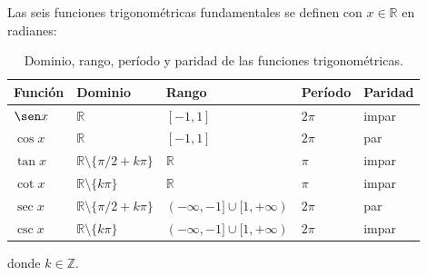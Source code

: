 \begin{definition}
Las seis funciones trigonométricas fundamentales se definen con $x \in \mathbb{R}$ en radianes:

\begin{table}[H]
\centering
\renewcommand{\arraystretch}{1.5}
\begin{tabular}{|l|l|l|l|l|}
\hline
\textbf{Función} & \textbf{Dominio} & \textbf{Rango} & \textbf{Período} & \textbf{Paridad} \\
\hline
$\sen x$ & $\mathbb{R}$ & $[-1,1]$ & $2\pi$ & impar \\
$\cos x$ & $\mathbb{R}$ & $[-1,1]$ & $2\pi$ & par \\
$\tan x$ & $\mathbb{R}\setminus\{\pi/2+k\pi\}$ & $\mathbb{R}$ & $\pi$ & impar \\
$\cot x$ & $\mathbb{R}\setminus\{k\pi\}$ & $\mathbb{R}$ & $\pi$ & impar \\
$\sec x$ & $\mathbb{R}\setminus\{\pi/2+k\pi\}$ & $(-\infty,-1]\cup[1,+\infty)$ & $2\pi$ & par \\
$\csc x$ & $\mathbb{R}\setminus\{k\pi\}$ & $(-\infty,-1]\cup[1,+\infty)$ & $2\pi$ & impar \\
\hline
\end{tabular}
\caption{Dominio, rango, período y paridad de las funciones trigonométricas.}
\end{table}
donde $k \in \mathbb{Z}$.
\end{definition}

